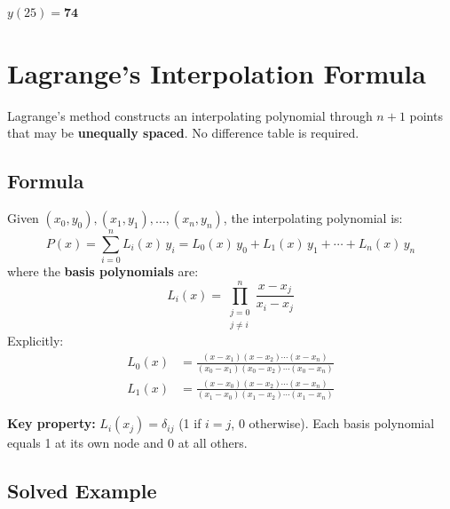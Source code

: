 \documentclass[12pt]{article}
\begin{document}
\begin{ansbox}
$y(25) = \mathbf{74}$
\end{ansbox}

\section{Lagrange's Interpolation Formula}

\begin{defbox}
Lagrange's method constructs an interpolating polynomial through $n+1$ points that may be \textbf{unequally spaced}. No difference table is required.
\end{defbox}

\subsection*{Formula}

\begin{formulabox}
Given $(x_0,y_0),(x_1,y_1),\ldots,(x_n,y_n)$, the interpolating polynomial is:
\[
  P(x) = \sum_{i=0}^{n} L_i(x)\,y_i
  = L_0(x)\,y_0 + L_1(x)\,y_1 + \cdots + L_n(x)\,y_n
\]
where the \textbf{basis polynomials} are:
\[
  L_i(x) = \prod_{\substack{j=0 \\ j\neq i}}^{n}
  \frac{x - x_j}{x_i - x_j}
\]
Explicitly:
\begin{align*}
  L_0(x) &= \frac{(x-x_1)(x-x_2)\cdots(x-x_n)}{(x_0-x_1)(x_0-x_2)\cdots(x_0-x_n)} \\[6pt]
  L_1(x) &= \frac{(x-x_0)(x-x_2)\cdots(x-x_n)}{(x_1-x_0)(x_1-x_2)\cdots(x_1-x_n)}
\end{align*}
\end{formulabox}

\begin{notebox}
\textbf{Key property:} $L_i(x_j) = \delta_{ij}$ (1 if $i=j$, 0 otherwise). Each basis polynomial equals 1 at its own node and 0 at all others.
\end{notebox}

\subsection*{Solved Example}
\end{document}
